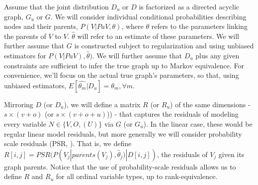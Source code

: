 \documentclass{article}
\begin{document}
\begin{table}[h]
\centering
{}
\smallskip
\caption{Notation}
\label{tab:notation}
\end{table}

Assume that the joint distribution $D_{u}$ or $D$ is factorized as a directed acyclic graph, $G_{u}$ or $G$.  We will consider individual conditional probabilities describing nodes and their parents, $P(V | Pa{V}, \theta)$, where $\theta$ refers to the parameters linking  the parents of $V$ to $V$.  $\hat{\theta}$ will refer to an estimate of these parameters.  We will further assume that $G$ is constructed subject to regularization and using unbiased estimators for $P(V | Pa{V}), \hat{\theta})$.  We will further assume that $D_u$ plus any given constraints are sufficient to infer the true graph up to Markov equivalence.  For convenience, we'll focus on the actual true graph's parameters, so that, using unbiased estimators, $E[\hat{\theta_m}|D_u] = \theta_m, \forall m$.

Mirroring $D$ (or $D_u$), we will define a matrix $R$ (or $R_u$) of the same dimensions - $s \times (v + o)$ (or $s \times (v + o + u)$)) - that captures the residuals of modeling every variable $N \in \{V, O, (U)\}$ via $G$ (or $G_u$).  In the linear case, these would be regular linear model residuals, but more generally we will consider probability scale residuals (PSR, \cite{shepherd_probability-scale_2016}).  That is, we define $R[i, j] = PSR(P(V_j | parents(V_j), \hat{\theta}_j) | D[i, j])$, the residuals of $V_j$ given its graph parents.  Notice that the use of probability-scale residuals allows us to define $R$ and $R_u$ for all ordinal variable types, up to rank-equivalence.
\end{document}
